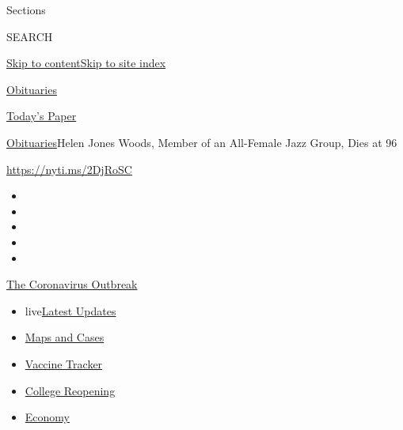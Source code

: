 Sections

SEARCH

\protect\hyperlink{site-content}{Skip to
content}\protect\hyperlink{site-index}{Skip to site index}

\href{https://www.nytimes3xbfgragh.onion/section/obituaries}{Obituaries}

\href{https://myaccount.nytimes3xbfgragh.onion/auth/login?response_type=cookie\&client_id=vi}{}

\href{https://www.nytimes3xbfgragh.onion/section/todayspaper}{Today's
Paper}

\href{/section/obituaries}{Obituaries}\textbar{}Helen Jones Woods,
Member of an All-Female Jazz Group, Dies at 96

\url{https://nyti.ms/2DjRoSC}

\begin{itemize}
\item
\item
\item
\item
\item
\end{itemize}

\href{https://www.nytimes3xbfgragh.onion/news-event/coronavirus?action=click\&pgtype=Article\&state=default\&region=TOP_BANNER\&context=storylines_menu}{The
Coronavirus Outbreak}

\begin{itemize}
\tightlist
\item
  live\href{https://www.nytimes3xbfgragh.onion/2020/08/04/world/coronavirus-cases.html?action=click\&pgtype=Article\&state=default\&region=TOP_BANNER\&context=storylines_menu}{Latest
  Updates}
\item
  \href{https://www.nytimes3xbfgragh.onion/interactive/2020/us/coronavirus-us-cases.html?action=click\&pgtype=Article\&state=default\&region=TOP_BANNER\&context=storylines_menu}{Maps
  and Cases}
\item
  \href{https://www.nytimes3xbfgragh.onion/interactive/2020/science/coronavirus-vaccine-tracker.html?action=click\&pgtype=Article\&state=default\&region=TOP_BANNER\&context=storylines_menu}{Vaccine
  Tracker}
\item
  \href{https://www.nytimes3xbfgragh.onion/2020/08/02/us/covid-college-reopening.html?action=click\&pgtype=Article\&state=default\&region=TOP_BANNER\&context=storylines_menu}{College
  Reopening}
\item
  \href{https://www.nytimes3xbfgragh.onion/live/2020/08/04/business/stock-market-today-coronavirus?action=click\&pgtype=Article\&state=default\&region=TOP_BANNER\&context=storylines_menu}{Economy}
\end{itemize}


